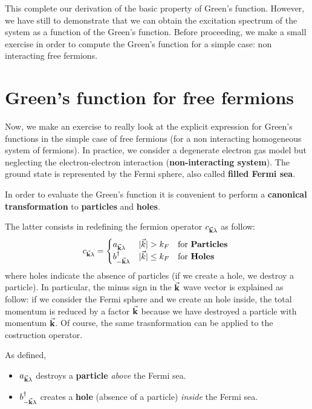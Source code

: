 \documentclass[../main/main.tex]{subfiles}
\begin{document}
This complete our derivation of the basic property of Green's function. However,  we have still to demonstrate that we can obtain the excitation spectrum of the system as a function of the Green's function. Before proceeding, we make a small exercise in order to compute the Green's function for a simple case: non interacting free fermions.









\section{Green's function for free fermions}

Now, we make an exercise to really look at the explicit expression for Green's functions in the simple case of free fermions (for a non interacting homogeneous system of fermions).
In practice, we consider a degenerate electron gas model but neglecting the electron-electron interaction (\textbf{non-interacting system}). The ground state is represented by the Fermi sphere, also called \textbf{filled Fermi sea}.

In order to evaluate the Green's function it is convenient to perform a \textbf{canonical transformation} to \textbf{particles} and \textbf{holes}.

The latter consists in redefining the fermion operator
\( c_{ \va{k}\lambda } \) as follow:
\begin{equation}
c_{\va{k}\lambda }=
  \begin{cases}
   a_{\va{k} \lambda } & | \vec{k} | > k_F \quad \text{for \textbf{Particles} }\\
   b_{-\va{k} \lambda }^\dag & | \vec{k} | \le k_F\quad \text{for \textbf{Holes} }
  \end{cases}
\end{equation}
where holes indicate the absence of particles (if we create a hole, we destroy a particle). In particular, the minus sign in the \( \va{k} \) wave vector is explained as follow: if we consider the Fermi sphere and we create an hole inside, the total momentum is reduced by a factor \( \va{k} \) because we have destroyed a particle with momentum \( \va{k} \).
Of course, the same trasnformation can be applied to the costruction operator.

As defined,
\begin{itemize}
\item \( a_{\va{k}\lambda  } \) destroys a \textbf{particle} \emph{above} the Fermi sea.
\item \(  b_{-\va{k} \lambda }^\dag \) creates a \textbf{hole} (absence of a particle) \emph{inside} the Fermi sea.
\end{itemize}
\end{document}
